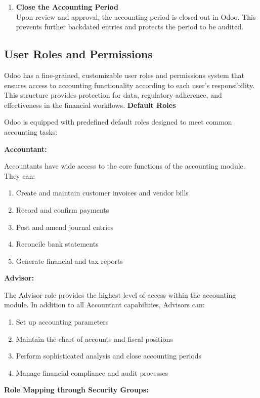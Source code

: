 \documentclass[11pt,a4paper]{article}
\begin{document}
\begin{enumerate}
    \item \textbf{Close the Accounting Period} \\
    Upon review and approval, the accounting period is closed out in Odoo. This prevents further backdated entries and protects the period to be audited.
\end{enumerate}

\subsection{User Roles and Permissions}
Odoo has a fine-grained, customizable user roles and permissions system that ensures access to accounting functionality according to each user's responsibility. This structure provides protection for data, regulatory adherence, and effectiveness in the financial workflows.
\bigskip
\noindent\textbf{Default Roles}

\noindent Odoo is equipped with predefined default roles designed to meet common accounting tasks:
\bigskip

\noindent\textbf{Accountant:}

\noindent Accountants have wide access to the core functions of the accounting module. They can:
\begin{enumerate}
    \item Create and maintain customer invoices and vendor bills
    \item Record and confirm payments
    \item Post and amend journal entries
    \item Reconcile bank statements
    \item Generate financial and tax reports
\end{enumerate}

\noindent\textbf{Advisor:}

\noindent The Advisor role provides the highest level of access within the accounting module. In addition to all Accountant capabilities, Advisors can:
\begin{enumerate}
    \item Set up accounting parameters
    \item Maintain the chart of accounts and fiscal positions
    \item Perform sophisticated analysis and close accounting periods
    \item Manage financial compliance and audit processes
\end{enumerate}

\noindent\textbf{Role Mapping through Security Groups:}
\end{document}
